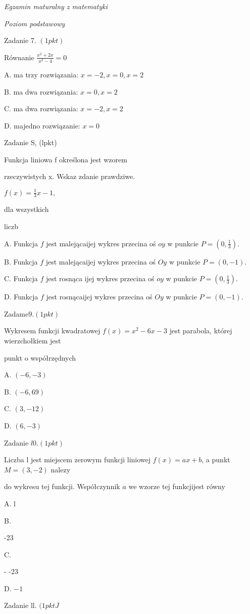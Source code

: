 \documentclass[a4paper,12pt]{article}
\begin{document}
{\it Egzamin maturalny z matematyki}

{\it Poziom podstawowy}

Zadanie 7. $(1pkt)$

Równanie $\displaystyle \frac{x^{2}+2x}{x^{2}-4}=0$

A. ma trzy rozwiązania: $x=-2, x=0, x=2$

B. ma dwa rozwiązania: $x=0, x=2$

C. ma dwa rozwiązania: $x=-2, x=2$

D. majedno rozwiązanie: $x=0$

Zadanie S, (lpkt)

Funkcja liniowa f określona jest wzorem

rzeczywistych x. Wskaz zdanie prawdziwe.

$f(x)=\displaystyle \frac{1}{3}x-1,$

dla wszystkich

liczb

A. Funkcja $f$ jest malejącaijej wykres przecina oś $oy$ w punkcie $P=(0,\displaystyle \frac{1}{3}).$

B. Funkcja $f$ jest malejącaijej wykres przecina oś $Oy$ w punkcie $P=(0,-1).$

C. Funkcja $f$ jest rosnąca ijej wykres przecina oś $oy$ w punkcie $P=(0,\displaystyle \frac{1}{3}).$

D. Funkcja $f$ jest rosnącaijej wykres przecina oś $Oy$ w punkcie $P=(0,-1).$

Zadam$\mathrm{e}9. (1pkt)$

Wykresem funkcji kwadratowej $f(x)=x^{2}-6x-3$ jest parabola, której wierzchołkiem jest

punkt o współrzędnych

A. $(-6,-3)$

B. $(-6,69)$

C. $(3,-12)$

D. $(6,-3)$

Zadanie $l0. (1pkt)$

Liczba l jest miejscem zerowym funkcji liniowej $f(x)=ax+b$, a punkt $M=(3,-2)$ nalezy

do wykresu tej funkcji. Współczynnik $a$ we wzorze tej funkcjijest równy

A. l

B.

-23

C.

- -23

D. $-1$

Zadanie ll. $(1pktJ$
\end{document}
